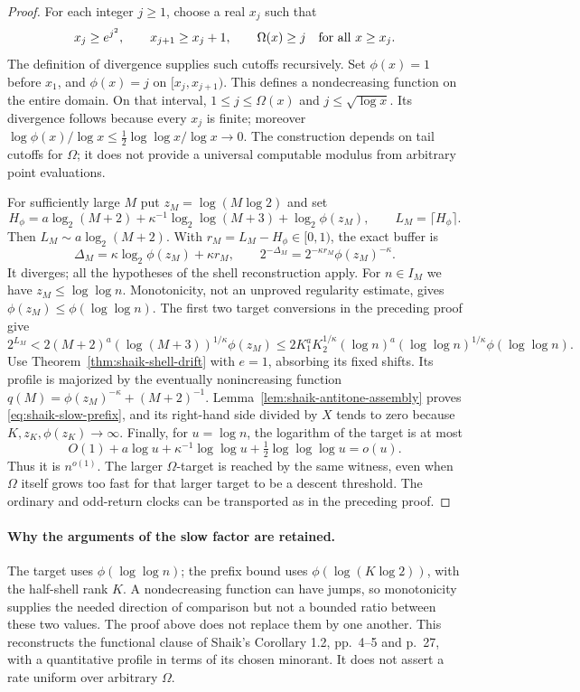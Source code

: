 \documentclass[11pt]{article}
\theoremstyle{remark}\newtheorem{remark}[proposition]{Remark}
\begin{document}
\begin{proof}
For each integer \(j\ge1\), choose a real \(x_j\) such that
\[
 x_j\ge e^{j^2},\qquad x_{j+1}\ge x_j+1,\qquad
 \Omega(x)\ge j\quad\hbox{for all }x\ge x_j.
\]
The definition of divergence supplies such cutoffs recursively.
Set \(\phi(x)=1\) before \(x_1\), and \(\phi(x)=j\) on
\([x_j,x_{j+1})\). This defines a nondecreasing function on the entire
domain. On that interval, \(1\le j\le\Omega(x)\) and
\(j\le\sqrt{\log x}\). Its divergence follows because every \(x_j\)
is finite; moreover
\(\log\phi(x)/\log x\le\frac12\log\log x/\log x\to0\).
The construction depends on tail cutoffs for \(\Omega\); it does not
provide a universal computable modulus from arbitrary point evaluations.

For sufficiently large \(M\) put \(z_M=\log(M\log2)\) and set
\[
 H_\phi=a\log_2(M+2)+\kappa^{-1}\log_2\log(M+3)
                      +\log_2\phi(z_M),\qquad L_M=\lceil H_\phi\rceil.
\]
Then \(L_M\sim a\log_2(M+2)\). With \(r_M=L_M-H_\phi\in[0,1)\),
the exact buffer is
\begin{equation}\label{eq:shaik-slow-cancellation}
 \Delta_M=\kappa\log_2\phi(z_M)+\kappa r_M,\qquad
 2^{-\Delta_M}=2^{-\kappa r_M}\phi(z_M)^{-\kappa}.
\end{equation}
It diverges; all the hypotheses of the shell reconstruction apply.
For \(n\in I_M\) we have \(z_M\le\log\log n\). Monotonicity, not an
unproved regularity estimate, gives
\(\phi(z_M)\le\phi(\log\log n)\).
The first two target conversions in the preceding proof give
\[
 2^{L_M}<2(M+2)^a(\log(M+3))^{1/\kappa}\phi(z_M)
 \le2K_1^aK_2^{1/\kappa}
       (\log n)^a(\log\log n)^{1/\kappa}\phi(\log\log n).
\]
Use Theorem~\ref{thm:shaik-shell-drift} with \(e=1\), absorbing its
fixed shifts. Its profile is majorized by the eventually nonincreasing
function \(q(M)=\phi(z_M)^{-\kappa}+(M+2)^{-1}\).
Lemma~\ref{lem:shaik-antitone-assembly} proves
\eqref{eq:shaik-slow-prefix}, and its right-hand side divided by \(X\)
tends to zero because \(K,z_K,\phi(z_K)\to\infty\).
Finally, for \(u=\log n\), the logarithm of the target is at most
\[
 O(1)+a\log u+\kappa^{-1}\log\log u+
                         \tfrac12\log\log\log u=o(u).
\]
Thus it is \(n^{o(1)}\). The larger \(\Omega\)-target is reached by the
same witness, even when \(\Omega\) itself grows too fast for that larger
target to be a descent threshold. The ordinary and odd-return clocks
can be transported as in the preceding proof.
\end{proof}

\paragraph{Why the arguments of the slow factor are retained.}
The target uses \(\phi(\log\log n)\); the prefix bound uses
\(\phi(\log(K\log2))\), with the half-shell rank \(K\).
A nondecreasing function can have jumps, so monotonicity supplies the
needed direction of comparison but not a bounded ratio between these
two values. The proof above does not replace them by one another.
This reconstructs the functional clause of Shaik's Corollary 1.2,
pp.~4--5 and p.~27, with a quantitative profile in terms of its chosen
minorant. It does not assert a rate uniform over arbitrary \(\Omega\).
\end{document}
